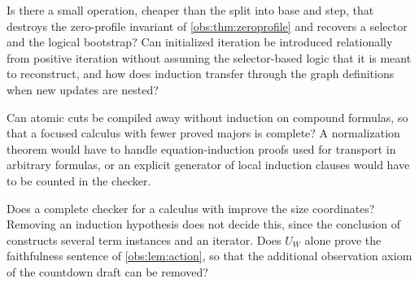 \begin{question}
Is there a small operation, cheaper than the split into base and step, that
destroys the zero-profile invariant of \cref{obs:thm:zeroprofile} and recovers
a selector and the logical bootstrap? Can initialized iteration be introduced
relationally from positive iteration without assuming the selector-based logic
that it is meant to reconstruct, and how does induction transfer through the
graph definitions when new updates are nested?
\end{question}

\begin{question}
Can atomic cuts be compiled away without induction on compound formulas, so
that a focused calculus with fewer proved majors is complete? A normalization
theorem would have to handle equation-induction proofs used for transport in
arbitrary formulas, or an explicit generator of local induction clauses would
have to be counted in the checker.
\end{question}

\begin{question}
Does a complete checker for a calculus with  improve the size
coordinates? Removing an induction hypothesis does not decide this, since the
conclusion of  constructs several term instances and an iterator.
Does $U_W$ alone prove the faithfulness sentence of \cref{obs:lem:action}, so
that the additional observation axiom of the countdown draft can be removed?
\end{question}

